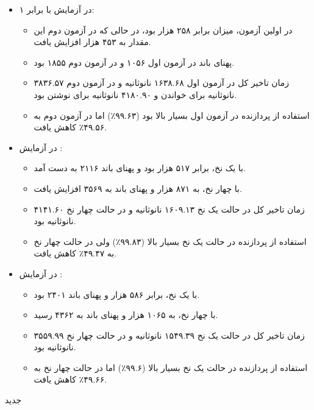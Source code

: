 \begin{itemize}
    \item در آزمایش  با  برابر ۱:
    \begin{itemize}
        \item در اولین آزمون، میزان  برابر ۲۵۸ هزار بود، در حالی که در آزمون دوم این مقدار به ۴۵۳ هزار افزایش یافت.
        \item پهنای باند در آزمون اول ۱۰۵۶  و در آزمون دوم ۱۸۵۵  بود.
        \item زمان تاخیر کل در آزمون اول ۱۶۳۸.۶۸ نانوثانیه و در آزمون دوم ۳۸۳۶.۵۷ نانوثانیه برای خواندن و ۴۱۸۰.۹۰ نانوثانیه برای نوشتن بود.
        \item استفاده از پردازنده در آزمون اول بسیار بالا بود (۹۹.۶۳٪) اما در آزمون دوم به ۴۹.۵۶٪ کاهش یافت.
    \end{itemize}
    
    \item در آزمایش :
    \begin{itemize}
        \item با یک نخ،  برابر ۵۱۷ هزار بود و پهنای باند ۲۱۱۶  به دست آمد.
        \item با چهار نخ،  به ۸۷۱ هزار و پهنای باند به ۳۵۶۹  افزایش یافت.
        \item زمان تاخیر کل در حالت یک نخ ۱۶۰۹.۱۳ نانوثانیه و در حالت چهار نخ ۴۱۴۱.۶۰ نانوثانیه بود.
        \item استفاده از پردازنده در حالت یک نخ بسیار بالا (۹۹.۸۳٪) ولی در حالت چهار نخ به ۴۹.۴۷٪ کاهش یافت.
    \end{itemize}
    
    \item در آزمایش :
    \begin{itemize}
        \item با یک نخ،  برابر ۵۸۶ هزار و پهنای باند ۲۴۰۱  بود.
        \item با چهار نخ،  به ۱۰۶۵ هزار و پهنای باند به ۴۳۶۲  رسید.
        \item زمان تاخیر کل در حالت یک نخ ۱۵۴۹.۳۹ نانوثانیه و در حالت چهار نخ ۳۵۵۹.۹۹ نانوثانیه بود.
        \item استفاده از پردازنده در حالت یک نخ بسیار بالا (۹۹.۶٪) اما در حالت چهار نخ به ۴۹.۶۶٪ کاهش یافت.
    \end{itemize}
\end{itemize}

‌جدید


